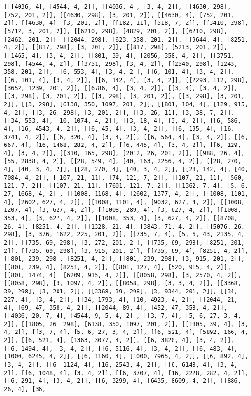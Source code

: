 \documentclass[12pt,fleqn]{article}\usepackage{../../common}
\begin{document}
\begin{verbatim}
[[[4036, 4], [4544, 4, 2]], [[4036, 4], [3, 4, 2]], [[4630, 298], [752, 201, 2]], [[4630, 298], [3, 201, 2]], [[4630, 4], [752, 201, 2]], [[4630, 4], [3, 201, 2]], [[182, 11], [518, 7, 2]], [[3410, 298], [5712, 3, 201, 2]], [[6210, 298], [4829, 201, 2]], [[6210, 298], [2462, 201, 2]], [[2044, 298], [623, 358, 201, 2]], [[9644, 4], [8251, 4, 2]], [[817, 298], [3, 201, 2]], [[817, 298], [5213, 201, 2]], [[1465, 4], [3, 4, 2]], [[801, 39, 4], [2056, 358, 4, 2]], [[3751, 298], [4544, 4, 2]], [[3751, 298], [3, 4, 2]], [[2540, 298], [1243, 358, 201, 2]], [[6, 553, 4], [3, 4, 2]], [[6, 101, 4], [3, 4, 2]], [[6, 101, 4], [3, 4, 2]], [[6, 142, 4], [3, 4, 2]], [[2293, 112, 298], [3652, 1239, 201, 2]], [[6786, 4], [3, 4, 2]], [[3, 4], [3, 4, 2]], [[3, 298], [3, 201, 2]], [[3, 298], [3, 201, 2]], [[3, 298], [3, 201, 2]], [[3, 298], [6138, 350, 1097, 201, 2]], [[801, 104, 4], [129, 915, 4, 2]], [[3, 26, 298], [3, 201, 2]], [[3, 26, 11], [3, 38, 7, 2]], [[34, 553, 4], [10, 1074, 4, 2]], [[3, 18, 4], [3, 4, 2]], [[6, 586, 4], [16, 4543, 4, 2]], [[6, 45, 4], [3, 4, 2]], [[6, 195, 4], [16, 3741, 4, 2]], [[6, 320, 4], [3, 4, 2]], [[6, 564, 4], [3, 4, 2]], [[6, 667, 4], [16, 1468, 282, 4, 2]], [[6, 445, 4], [3, 4, 2]], [[6, 129, 4], [3, 4, 2]], [[310, 165, 298], [2012, 26, 201, 2]], [[988, 26, 4], [55, 2838, 4, 2]], [[28, 549, 4], [40, 163, 2256, 4, 2]], [[28, 270, 4], [40, 3, 4, 2]], [[28, 270, 4], [40, 3, 4, 2]], [[28, 142, 4], [40, 7084, 4, 2]], [[107, 21, 11], [74, 121, 7, 2]], [[107, 21, 11], [560, 121, 7, 2]], [[107, 21, 11], [7601, 121, 7, 2]], [[1362, 7, 4], [5, 6, 27, 1668, 4, 2]], [[1008, 1168, 4], [2602, 1377, 4, 2]], [[1008, 1101, 4], [2602, 627, 4, 2]], [[1008, 1101, 4], [9032, 627, 4, 2]], [[1008, 1207, 4], [3, 627, 4, 2]], [[1008, 289, 4], [3, 627, 4, 2]], [[1008, 353, 4], [3, 627, 4, 2]], [[1008, 353, 4], [3, 627, 4, 2]], [[8708, 26, 4], [8251, 4, 2]], [[1328, 21, 4], [3843, 71, 4, 2]], [[5076, 26, 298], [3, 376, 1622, 225, 201, 2]], [[735, 7, 4], [5, 6, 43, 2135, 4, 2]], [[735, 69, 298], [3, 272, 201, 2]], [[735, 69, 298], [8251, 201, 2]], [[735, 69, 298], [3, 915, 201, 2]], [[735, 69, 4], [8251, 4, 2]], [[801, 239, 298], [8251, 4, 2]], [[801, 239, 298], [3, 915, 201, 2]], [[801, 239, 4], [8251, 4, 2]], [[801, 127, 4], [520, 915, 4, 2]], [[801, 1474, 4], [6209, 915, 4, 2]], [[8058, 298], [3, 2570, 4, 2]], [[8058, 298], [3, 1097, 4, 2]], [[8058, 298], [3, 3, 4, 2]], [[3368, 39, 298], [3, 201, 2]], [[3368, 39, 298], [3, 9344, 201, 2]], [[34, 227, 4], [3, 4, 2]], [[34, 1793, 4], [10, 4923, 4, 2]], [[2044, 21, 4], [69, 47, 358, 4, 2]], [[2044, 89, 4], [452, 47, 358, 4, 2]], [[4036, 20, 7, 4], [4544, 9, 5, 4, 2]], [[3, 7, 4], [5, 6, 27, 3, 4, 2]], [[1805, 26, 298], [6138, 350, 1097, 201, 2]], [[1805, 39, 4], [3, 4, 2]], [[3, 7, 4], [5, 6, 27, 3, 4, 2]], [[6, 521, 4], [5892, 166, 4, 2]], [[6, 521, 4], [1363, 3077, 4, 2]], [[6, 3820, 4], [3, 4, 2]], [[6, 1494, 4], [3, 4, 2]], [[6, 5116, 4], [3, 4, 2]], [[6, 483, 4], [1000, 6245, 4, 2]], [[6, 1160, 4], [1000, 7965, 4, 2]], [[6, 892, 4], [3, 4, 2]], [[6, 1124, 4], [16, 2543, 4, 2]], [[6, 6148, 4], [3, 4, 2]], [[6, 1048, 4], [3, 4, 2]], [[6, 3707, 4], [16, 2228, 282, 4, 2]], [[6, 291, 4], [3, 4, 2]], [[6, 3299, 4], [6435, 8609, 4, 2]], [[886, 26, 4], [36, 
\end{verbatim}
\end{document}
